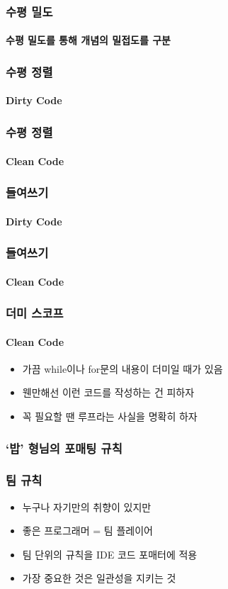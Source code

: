 \documentclass{beamer}
\begin{document}
\begin{frame}
    \frametitle{수평 밀도}
    \framesubtitle{수평 밀도를 통해 개념의 밀접도를 구분}
    
    
\end{frame}

\begin{frame}
    \frametitle{수평 정렬}
    \framesubtitle{Dirty Code}
    
\end{frame}

\begin{frame}
    \frametitle{수평 정렬}
    \framesubtitle{Clean Code}
    
\end{frame}

\begin{frame}
    \frametitle{들여쓰기}
    \framesubtitle{Dirty Code}
    
\end{frame}

\begin{frame}
    \frametitle{들여쓰기}
    \framesubtitle{Clean Code}
    
\end{frame}

\begin{frame}
    \frametitle{더미 스코프}
    \framesubtitle{Clean Code}
    
    \begin{itemize}
        \item 가끔 while이나 for문의 내용이 더미일 때가 있음
        \item 웬만해선  이런 코드를 작성하는 건 피하자
        \item 꼭 필요할 땐 루프라는 사실을 명확히 하자
    \end{itemize}
\end{frame}

\begin{frame}
    \frametitle{`밥' 형님의 포매팅 규칙}
\end{frame}

\begin{frame}
    \frametitle{팀 규칙}
    \begin{itemize}
        \item 누구나 자기만의 취향이 있지만
        \item 좋은 프로그래머 = 팀 플레이어
        \item 팀 단위의 규칙을 IDE 코드 포매터에 적용
        \item 가장 중요한 것은 일관성을 지키는 것
    \end{itemize}
\end{frame}
\end{document}
